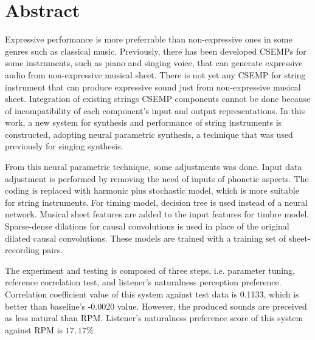 \clearpage
\chapter*{Abstract}

Expressive performance is more preferrable than non-expressive ones in some genres such as classical music. Previously, there has been developed CSEMPs for some instruments, such as piano and singing voice, that can generate expressive audio from non-expressive musical sheet. There is not yet any CSEMP for string instrument that can produce expressive sound just from non-expressive musical sheet. Integration of existing strings CSEMP components cannot be done because of incompatibility of each component's input and output representations. In this work, a new system for synthesis and performance of string instruments is constructed, adopting neural parametric synthesis, a technique that was used previously for singing synthesis.

From this neural parametric technique, some adjustments was done. Input data adjustment is performed by removing the need of inputs of phonetic aspects. The coding is replaced with harmonic plus stochastic model, which is more suitable for string instruments. For timing model, decision tree is used instead of a neural network. Musical sheet features are added to the input features for timbre model. Sparse-dense dilations for causal convolutions is used in place of the original dilated causal convolutions. These models are trained with a training set of sheet-recording pairs.

The experiment and testing is composed of three steps, i.e. parameter tuning, reference correlation test, and listener's naturalness perception preference. Correlation coefficient value of this system against test data is 0.1133, which is better than baseline's -0.0020 value. However, the produced sounds are preceived as less natural than RPM. Listener's naturalness preference score of this system against RPM is $17,17\%$

\clearpage